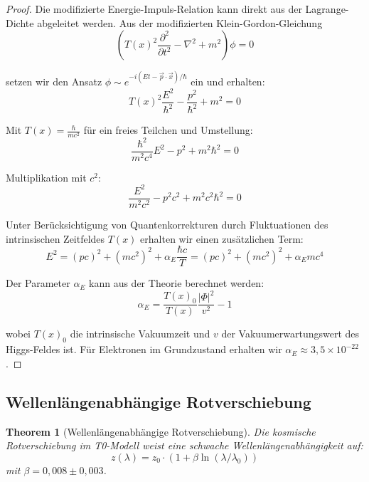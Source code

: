 \documentclass{article}
\newtheorem{theorem}{Theorem}[section]
\theoremstyle{definition}
\theoremstyle{remark}
\newcommand{\Tfield}{T(x)} %
\begin{document}
		\begin{proof}
			Die modifizierte Energie-Impuls-Relation kann direkt aus der Lagrange-Dichte abgeleitet werden. Aus der modifizierten Klein-Gordon-Gleichung
			\begin{equation}
				\left(\Tfield^2\frac{\partial^2}{\partial t^2} - \nabla^2 + m^2\right) \phi = 0
			\end{equation}
			
			setzen wir den Ansatz $\phi \sim e^{-i(Et-\vec{p}\cdot\vec{x})/\hbar}$ ein und erhalten:
			\begin{equation}
				\Tfield^2 \frac{E^2}{\hbar^2} - \frac{p^2}{\hbar^2} + m^2 = 0
			\end{equation}
			
			Mit $\Tfield = \frac{\hbar}{mc^2}$ für ein freies Teilchen und Umstellung:
			\begin{equation}
				\frac{\hbar^2}{m^2c^4}E^2 - p^2 + m^2\hbar^2 = 0
			\end{equation}
			
			Multiplikation mit $c^2$:
			\begin{equation}
				\frac{E^2}{m^2c^2} - p^2c^2 + m^2c^2\hbar^2 = 0
			\end{equation}
			
			Unter Berücksichtigung von Quantenkorrekturen durch Fluktuationen des intrinsischen Zeitfeldes $\Tfield$ erhalten wir einen zusätzlichen Term:
			\begin{equation}
				E^2 = (pc)^2 + (mc^2)^2 + \alpha_E\frac{\hbar c}{T} = (pc)^2 + (mc^2)^2 + \alpha_E mc^4
			\end{equation}
			
			Der Parameter $\alpha_E$ kann aus der Theorie berechnet werden:
			\begin{equation}
				\alpha_E = \frac{\Tfield_0}{\Tfield} \frac{|\Phi|^2}{v^2} - 1
			\end{equation}
			
			wobei $\Tfield_0$ die intrinsische Vakuumzeit und $v$ der Vakuumerwartungswert des Higgs-Feldes ist. Für Elektronen im Grundzustand erhalten wir $\alpha_E \approx 3,5 \times 10^{-22}$.
		\end{proof}
		
		\subsection{Wellenlängenabhängige Rotverschiebung}
		
		\begin{theorem}[Wellenlängenabhängige Rotverschiebung]
			Die kosmische Rotverschiebung im T0-Modell weist eine schwache Wellenlängenabhängigkeit auf:
			\begin{equation}
				z(\lambda) = z_0 \cdot (1 + \beta\ln(\lambda/\lambda_0))
			\end{equation}
			mit $\beta = 0,008 \pm 0,003$.
		\end{theorem}
		
\end{document}
